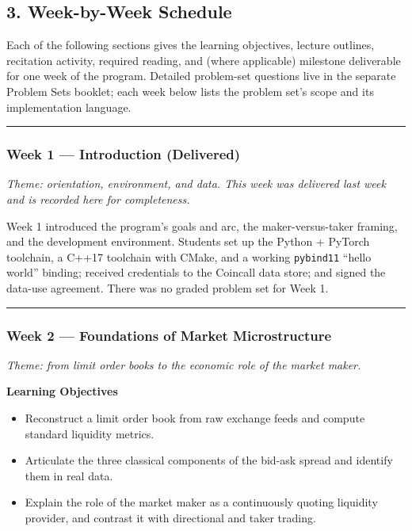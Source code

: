 \documentclass[
]{article}
\providecommand{\tightlist}{%
  \setlength{\itemsep}{0pt}\setlength{\parskip}{0pt}}
\begin{document}
\subsection{3. Week-by-Week Schedule}\label{week-by-week-schedule}

Each of the following sections gives the learning objectives, lecture
outlines, recitation activity, required reading, and (where applicable)
milestone deliverable for one week of the program. Detailed problem-set
questions live in the separate Problem Sets booklet; each week below
lists the problem set's scope and its implementation language.

\begin{center}\rule{0.5\linewidth}{0.5pt}\end{center}

\subsubsection{Week 1 --- Introduction
(Delivered)}\label{week-1-introduction-delivered}

\emph{Theme: orientation, environment, and data. This week was delivered
last week and is recorded here for completeness.}

Week 1 introduced the program's goals and arc, the maker-versus-taker
framing, and the development environment. Students set up the Python +
PyTorch toolchain, a C++17 toolchain with CMake, and a working
\texttt{pybind11} ``hello world'' binding; received credentials to the
Coincall data store; and signed the data-use agreement. There was no
graded problem set for Week 1.

\begin{center}\rule{0.5\linewidth}{0.5pt}\end{center}

\subsubsection{Week 2 --- Foundations of Market
Microstructure}\label{week-2-foundations-of-market-microstructure}

\emph{Theme: from limit order books to the economic role of the market
maker.}

\textbf{Learning Objectives}

\begin{itemize}
\tightlist
\item
  Reconstruct a limit order book from raw exchange feeds and compute
  standard liquidity metrics.
\item
  Articulate the three classical components of the bid-ask spread and
  identify them in real data.
\item
  Explain the role of the market maker as a continuously quoting
  liquidity provider, and contrast it with directional and taker
  trading.
\end{itemize}
\end{document}
